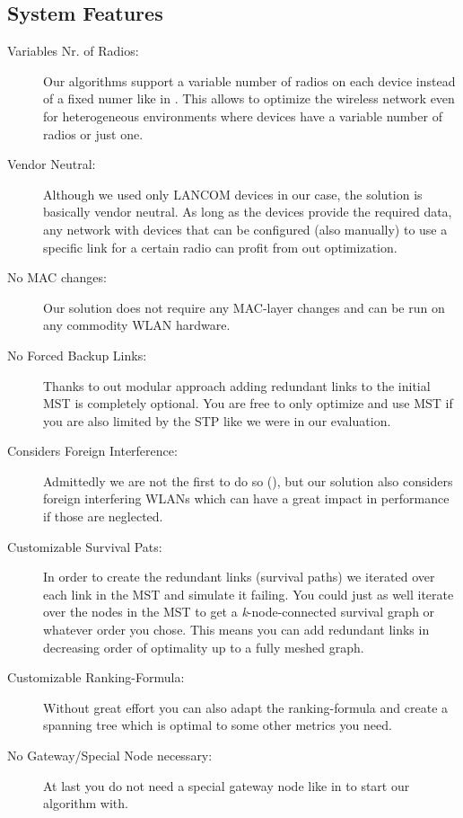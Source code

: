       \subsection{System Features}
	\begin{description}
	  \item [Variables Nr. of Radios:] Our algorithms support a variable number of radios on each device instead of a fixed numer like in \cite{INSTC}. 
	    This allows to optimize the wireless network even for heterogeneous environments where devices have a variable number of radios or just one.
	  \item [Vendor Neutral:] Although we used only LANCOM devices in our case, the solution is basically vendor neutral. As long as the devices provide the required data,
	    any network with devices that can be configured (also manually) to use a specific link for a certain radio can profit from out optimization.
	  \item [No MAC changes:] Our solution does not require any \ac{MAC}-layer changes and can be run on any commodity \ac{WLAN} hardware.
	  \item [No Forced Backup Links:] Thanks to out modular approach adding redundant links to the initial \ac{MST} is completely optional. 
	    You are free to only optimize and use MST if you are also limited by the STP like we were in our evaluation.
	  \item [Considers Foreign Interference:] Admittedly we are not the first to do so (\cite{BFS-CA}), but our solution also considers foreign interfering WLANs which can have a great impact in performance
	    if those are neglected.
	  \item [Customizable Survival Pats:] In order to create the redundant links (survival paths) we iterated over each link in the MST and simulate it failing.
	    You could just as well iterate over the nodes in the MST to get a \textit{k}-node-connected survival graph or whatever order you chose.
	    This means you can add redundant links in decreasing order of optimality up to a fully meshed graph.
	  \item [Customizable Ranking-Formula:] Without great effort you can also adapt the ranking-formula and create a spanning tree which is optimal to some other metrics you need.
	  \item [No Gateway/Special Node necessary:] At last you do not need a special gateway node like in \cite{BFS-CA} to start our algorithm with.
	\end{description}